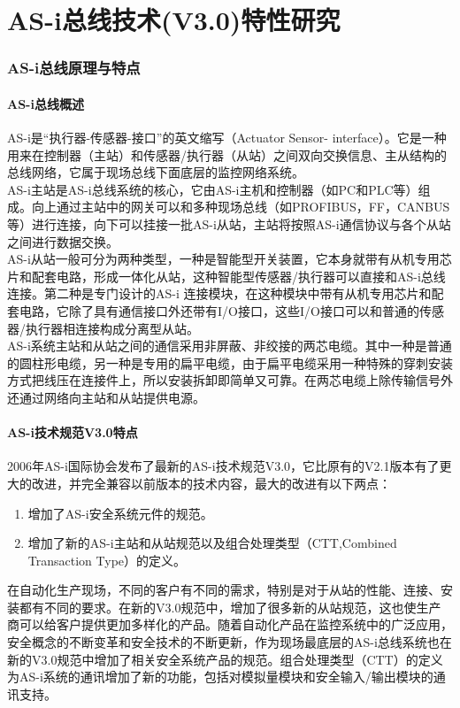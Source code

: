 \tableofcontents
\clearpage

\part{AS-i总线技术(V3.0)特性研究}
\section{AS-i总线原理与特点}
\subsection{AS-i总线概述}
AS-i是“执行器-传感器-接口”的英文缩写（Actuator Sensor- interface）。它是一种用来在控制器（主站）和传感器/执行器（从站）之间双向交换信息、主从结构的总线网络，它属于现场总线下面底层的监控网络系统。\\
AS-i主站是AS-i总线系统的核心，它由AS-i主机和控制器（如PC和PLC等）组成。向上通过主站中的网关可以和多种现场总线（如PROFIBUS，FF，CANBUS等）进行连接，向下可以挂接一批AS-i从站，主站将按照AS-i通信协议与各个从站之间进行数据交换。\\
AS-i从站一般可分为两种类型，一种是智能型开关装置，它本身就带有从机专用芯片和配套电路，形成一体化从站，这种智能型传感器/执行器可以直接和AS-i总线连接。第二种是专门设计的AS-i 连接模块，在这种模块中带有从机专用芯片和配套电路，它除了具有通信接口外还带有I/O接口，这些I/O接口可以和普通的传感器/执行器相连接构成分离型从站。\\
AS-i系统主站和从站之间的通信采用非屏蔽、非绞接的两芯电缆。其中一种是普通的圆柱形电缆，另一种是专用的扁平电缆，由于扁平电缆采用一种特殊的穿刺安装方式把线压在连接件上，所以安装拆卸即简单又可靠。在两芯电缆上除传输信号外还通过网络向主站和从站提供电源。
\subsection{AS-i技术规范V3.0特点}
2006年AS-i国际协会发布了最新的AS-i技术规范V3.0，它比原有的V2.1版本有了更大的改进，并完全兼容以前版本的技术内容，最大的改进有以下两点：
\begin{enumerate}
\item 增加了AS-i安全系统元件的规范。
\item 增加了新的AS-i主站和从站规范以及组合处理类型（CTT,Combined Transaction Type）的定义。
\end{enumerate}
在自动化生产现场，不同的客户有不同的需求，特别是对于从站的性能、连接、安装都有不同的要求。在新的V3.0规范中，增加了很多新的从站规范，这也使生产商可以给客户提供更加多样化的产品。随着自动化产品在监控系统中的广泛应用，安全概念的不断变革和安全技术的不断更新，作为现场最底层的AS-i总线系统也在新的V3.0规范中增加了相关安全系统产品的规范。组合处理类型（CTT）的定义为AS-i系统的通讯增加了新的功能，包括对模拟量模块和安全输入/输出模块的通讯支持。
